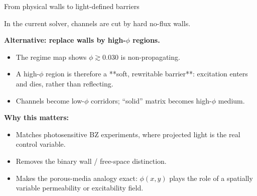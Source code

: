 \documentclass[aspectratio=169,11pt]{beamer}
\begin{document}
\begin{frame}{From physical walls to light-defined barriers}

In the current solver, channels are cut by hard no-flux walls.

\vspace{0.3cm}
\textbf{Alternative: replace walls by high-$\phi$ regions.}

\vspace{0.2cm}
\begin{itemize}
    \item The regime map shows $\phi \gtrsim 0.030$ is non-propagating.
    \item A high-$\phi$ region is therefore a **soft, rewritable barrier**: excitation enters and dies, rather than reflecting.
    \item Channels become low-$\phi$ corridors; ``solid'' matrix becomes high-$\phi$ medium.
\end{itemize}

\vspace{0.3cm}
\textbf{Why this matters:}
\begin{itemize}
    \item Matches photosensitive BZ experiments, where projected light is the real control variable.
    \item Removes the binary wall / free-space distinction.
    \item Makes the porous-media analogy exact: $\phi(x,y)$ plays the role of a spatially variable permeability or excitability field.
\end{itemize}

\end{frame}
\end{document}
